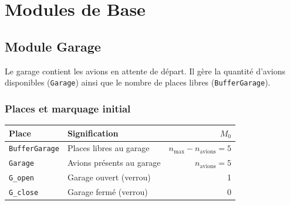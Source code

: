 \documentclass[a4paper,12pt]{article}
\begin{document}
\newpage
\section{Modules de Base}

\subsection{Module Garage}

Le garage contient les avions en attente de départ. Il gère la quantité d'avions
disponibles (\texttt{Garage}) ainsi que le nombre de places libres (\texttt{BufferGarage}).

\subsubsection{Places et marquage initial}
\begin{center}
\begin{tabular}{llr}
\toprule
\textbf{Place} & \textbf{Signification} & $M_0$ \\
\midrule
\texttt{BufferGarage} & Places libres au garage & $n_{\max} - n_{\mathrm{avions}} = 5$ \\
\texttt{Garage}       & Avions présents au garage & $n_{\mathrm{avions}} = 5$ \\
\texttt{G\_open}      & Garage ouvert (verrou) & 1 \\
\texttt{G\_close}     & Garage fermé (verrou)  & 0 \\
\bottomrule
\end{tabular}
\end{center}
\end{document}

